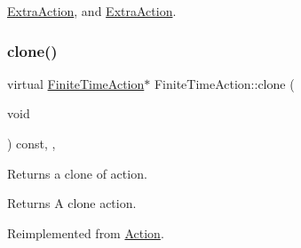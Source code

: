 \hyperlink{classExtraAction_ab934c199930dec4d3bff42d61ce940da}{Extra\+Action}, and \hyperlink{classExtraAction_a758a349952071ad00b74ddf34cfa9b2a}{Extra\+Action}.

\mbox{\label{classFiniteTimeAction_a44813fca4fdf22f367a4657147dd150b}} 
\subsubsection{\texorpdfstring{clone()}{clone()}\hspace{0.1cm}{\footnotesize\ttfamily [2/2]}}
{\footnotesize\ttfamily virtual \hyperlink{classFiniteTimeAction}{Finite\+Time\+Action}$\ast$ Finite\+Time\+Action\+::clone (\begin{DoxyParamCaption}\item[{void}]{ }\end{DoxyParamCaption}) const\hspace{0.3cm}{\ttfamily [inline]}, {\ttfamily [override]}, {\ttfamily [virtual]}}

Returns a clone of action.

\begin{DoxyReturn}{Returns}
A clone action. 
\end{DoxyReturn}


Reimplemented from \hyperlink{classAction_a6a047ad6b3bd200b0f86c7bb519b31ea}{Action}.



